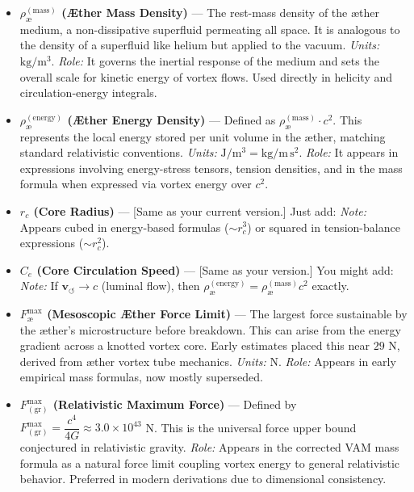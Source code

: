 \documentclass[11pt]{article}
\begin{document}
\begin{itemize}
    \item \textbf{$\rho_{\text{\ae}}^{(\mathrm{mass})}$ (Æther Mass Density)} — The rest-mass density of the æther medium, a non-dissipative superfluid permeating all space. It is analogous to the density of a superfluid like helium but applied to the vacuum. \textit{Units:} $\mathrm{kg/m^3}$. \textit{Role:} It governs the inertial response of the medium and sets the overall scale for kinetic energy of vortex flows. Used directly in helicity and circulation-energy integrals.

    \item \textbf{$\rho_{\text{\ae}}^{(\mathrm{energy})}$ (Æther Energy Density)} — Defined as $\rho_{\text{\ae}}^{(\mathrm{mass})} \cdot c^2$. This represents the local energy stored per unit volume in the æther, matching standard relativistic conventions. \textit{Units:} $\mathrm{J/m^3} = \mathrm{kg/m\,s^2}$. \textit{Role:} It appears in expressions involving energy-stress tensors, tension densities, and in the mass formula when expressed via vortex energy over $c^2$.

    \item \textbf{$r_c$ (Core Radius)} — [Same as your current version.] Just add: \textit{Note:} Appears cubed in energy-based formulas ($\sim r_c^3$) or squared in tension-balance expressions ($\sim r_c^2$).

    \item \textbf{$C_e$ (Core Circulation Speed)} — [Same as your version.] You might add: \textit{Note:} If $\mathbf{v}_{\scriptscriptstyle\boldsymbol{\circlearrowleft}} \to c$ (luminal flow), then $\rho_{\text{\ae}}^{(\mathrm{energy})} = \rho_{\text{\ae}}^{(\mathrm{mass})} c^2$ exactly.

    \item \textbf{$F^{\max}_{\text{\ae}}$ (Mesoscopic Æther Force Limit)} — The largest force sustainable by the æther's microstructure before breakdown. This can arise from the energy gradient across a knotted vortex core. Early estimates placed this near $29$ N, derived from æther vortex tube mechanics. \textit{Units:} N. \textit{Role:} Appears in early empirical mass formulas, now mostly superseded.

    \item \textbf{$F^{\max}_{(\mathrm{gr})}$ (Relativistic Maximum Force)} — Defined by $F^{\max}_{(\mathrm{gr})} = \dfrac{c^4}{4G} \approx 3.0 \times 10^{43}$ N. This is the universal force upper bound conjectured in relativistic gravity. \textit{Role:} Appears in the corrected VAM mass formula as a natural force limit coupling vortex energy to general relativistic behavior. Preferred in modern derivations due to dimensional consistency.
\end{itemize}
\end{document}
